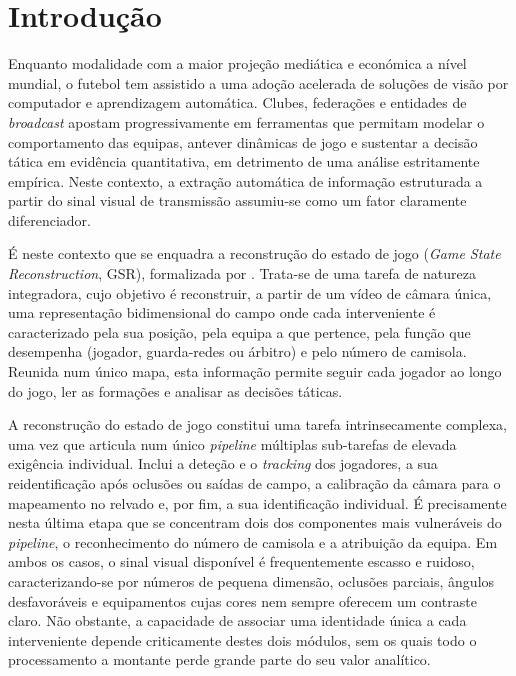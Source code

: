 \chapter{Introdução}\label{cap:introducao}

Enquanto modalidade com a maior projeção mediática e económica a nível mundial, o futebol tem
assistido a uma adoção acelerada de soluções de visão por computador e aprendizagem automática.
Clubes, federações e entidades de \emph{broadcast} apostam progressivamente em ferramentas que
permitam modelar o comportamento das equipas, antever dinâmicas de jogo e sustentar a decisão
tática em evidência quantitativa, em detrimento de uma análise estritamente empírica. Neste
contexto, a extração automática de informação estruturada a partir do sinal visual de transmissão
assumiu-se como um fator claramente diferenciador.

É neste contexto que se enquadra a reconstrução do estado de jogo (\emph{Game State
Reconstruction}, GSR), formalizada por \citet{somers2024soccernet}. Trata-se de uma tarefa de
natureza integradora, cujo objetivo é reconstruir, a partir de um vídeo de câmara única, uma
representação bidimensional do campo onde cada interveniente é caracterizado pela sua posição, pela
equipa a que pertence, pela função que desempenha (jogador, guarda-redes ou árbitro) e pelo número
de camisola. Reunida num único mapa, esta informação permite seguir cada jogador ao longo do jogo,
ler as formações e analisar as decisões táticas.

A reconstrução do estado de jogo constitui uma tarefa intrinsecamente complexa, uma vez que articula
num único \emph{pipeline} múltiplas sub-tarefas de elevada exigência individual. Inclui a deteção e
o \emph{tracking} dos jogadores, a sua reidentificação após oclusões ou saídas de campo, a
calibração da câmara para o mapeamento no relvado e, por fim, a sua identificação individual. É
precisamente nesta última etapa que se concentram dois dos componentes mais vulneráveis do
\emph{pipeline}, o reconhecimento do número de camisola e a atribuição da equipa. Em ambos os
casos, o sinal visual disponível é frequentemente escasso e ruidoso, caracterizando-se por números
de pequena dimensão, oclusões parciais, ângulos desfavoráveis e equipamentos cujas cores nem sempre
oferecem um contraste claro. Não obstante, a capacidade de associar uma identidade única a cada
interveniente depende criticamente destes dois módulos, sem os quais todo o processamento a
montante perde grande parte do seu valor analítico.

